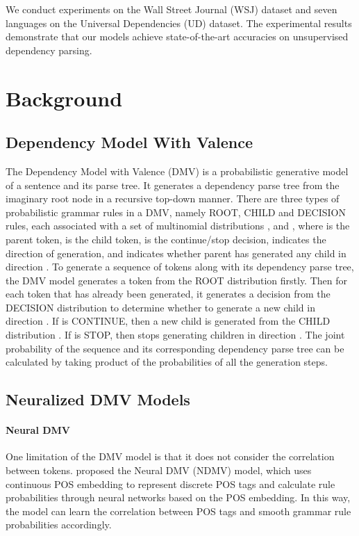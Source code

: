 \documentclass[11pt]{article}
\begin{document}
We conduct experiments on the Wall Street Journal (WSJ) dataset and seven languages on the Universal Dependencies (UD) dataset. The experimental results demonstrate that our models achieve state-of-the-art accuracies on unsupervised dependency parsing. 











\section{Background}


\subsection{Dependency Model With Valence}
The Dependency Model with Valence (DMV) \cite{Klein2004CorpusBasedIO} is a probabilistic generative model of a sentence and its parse tree.  It generates a dependency parse tree from the imaginary root node in a recursive top-down manner. There are three types of probabilistic grammar rules in a DMV, namely ROOT, CHILD and DECISION rules, each associated with a set of multinomial distributions ,  and , where  is the parent token,  is the child token,  is the continue/stop decision,  indicates the direction of generation, and  indicates whether parent  has generated any child in direction . To generate a sequence of tokens along with its dependency parse tree, the DMV model generates a token  from the ROOT distribution  firstly. Then for each token  that has already been generated, it generates a decision from the DECISION distribution  to determine whether to generate a new child in direction . If  is CONTINUE, then a new child  is generated from the CHILD distribution . If  is STOP, then  stops generating children in direction . The joint probability of the sequence and its corresponding dependency parse tree can be calculated by taking product of the probabilities of all the generation steps. 



\subsection{Neuralized DMV Models}
\paragraph{Neural DMV} One limitation of the DMV model is that it does not consider the correlation between tokens.   proposed the Neural DMV (NDMV) model, which uses continuous POS embedding to represent discrete POS tags and calculate rule probabilities through neural networks based on the POS embedding. In this way, the model can learn the correlation between POS tags and smooth grammar rule probabilities accordingly.
\end{document}
